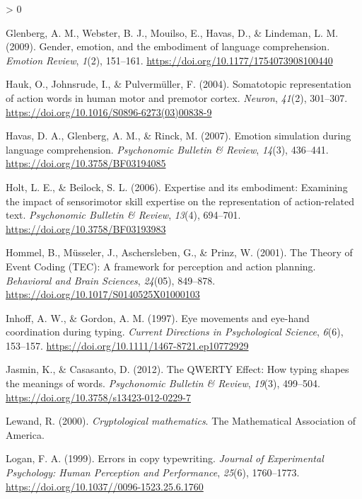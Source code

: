 \documentclass[
  english,
  man,mask]{apa7}
\newlength{\cslhangindent}
\newenvironment{CSLReferences}[2] %
 {%
  \setlength{\parindent}{0pt}
  \ifodd #1 \everypar{\setlength{\hangindent}{\cslhangindent}}\ignorespaces\fi
  \ifnum #2 > 0
  \setlength{\parskip}{#2\baselineskip}
  \fi
 }%
 {}
\begin{document}
\begin{CSLReferences}{1}{0}
\leavevmode\hypertarget{ref-Glenberg2009}{}%
Glenberg, A. M., Webster, B. J., Mouilso, E., Havas, D., \& Lindeman, L. M. (2009). {Gender, emotion, and the embodiment of language comprehension}. \emph{Emotion Review}, \emph{1}(2), 151--161. \url{https://doi.org/10.1177/1754073908100440}

\leavevmode\hypertarget{ref-Hauk2004}{}%
Hauk, O., Johnsrude, I., \& Pulvermüller, F. (2004). {Somatotopic representation of action words in human motor and premotor cortex}. \emph{Neuron}, \emph{41}(2), 301--307. \url{https://doi.org/10.1016/S0896-6273(03)00838-9}

\leavevmode\hypertarget{ref-Havas2007}{}%
Havas, D. A., Glenberg, A. M., \& Rinck, M. (2007). {Emotion simulation during language comprehension}. \emph{Psychonomic Bulletin {\&} Review}, \emph{14}(3), 436--441. \url{https://doi.org/10.3758/BF03194085}

\leavevmode\hypertarget{ref-Holt2006}{}%
Holt, L. E., \& Beilock, S. L. (2006). {Expertise and its embodiment: Examining the impact of sensorimotor skill expertise on the representation of action-related text}. \emph{Psychonomic Bulletin {\&} Review}, \emph{13}(4), 694--701. \url{https://doi.org/10.3758/BF03193983}

\leavevmode\hypertarget{ref-Hommel2001}{}%
Hommel, B., Müsseler, J., Aschersleben, G., \& Prinz, W. (2001). {The Theory of Event Coding (TEC): A framework for perception and action planning}. \emph{Behavioral and Brain Sciences}, \emph{24}(05), 849--878. \url{https://doi.org/10.1017/S0140525X01000103}

\leavevmode\hypertarget{ref-Inhoff1997}{}%
Inhoff, A. W., \& Gordon, A. M. (1997). {Eye movements and eye-hand coordination during typing}. \emph{Current Directions in Psychological Science}, \emph{6}(6), 153--157. \url{https://doi.org/10.1111/1467-8721.ep10772929}

\leavevmode\hypertarget{ref-Jasmin2012}{}%
Jasmin, K., \& Casasanto, D. (2012). {The QWERTY Effect: How typing shapes the meanings of words.} \emph{Psychonomic Bulletin {\&} Review}, \emph{19}(3), 499--504. \url{https://doi.org/10.3758/s13423-012-0229-7}

\leavevmode\hypertarget{ref-Lewand2000}{}%
Lewand, R. (2000). \emph{{Cryptological mathematics}}. The Mathematical Association of America.

\leavevmode\hypertarget{ref-Logan1999}{}%
Logan, F. A. (1999). {Errors in copy typewriting}. \emph{Journal of Experimental Psychology: Human Perception and Performance}, \emph{25}(6), 1760--1773. \url{https://doi.org/10.1037//0096-1523.25.6.1760}


\end{CSLReferences}
\end{document}
